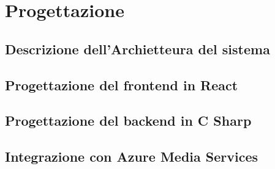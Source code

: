 \chapter{Progettazione}

\section{Descrizione dell'Archietteura del sistema}

\section{Progettazione del frontend in React}

\section{Progettazione del backend in C Sharp}

\section{Integrazione con Azure Media Services}